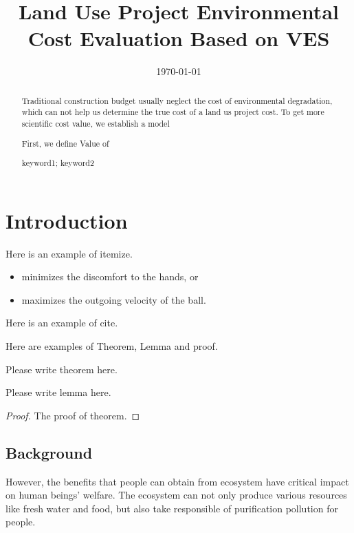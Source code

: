 \documentclass{mcmthesis}
\title{Land Use Project Environmental Cost Evaluation Based on VES}
\date{\today}
\newcommand{\upcite}[1]{\textsuperscript{\textsuperscript{\cite{#1}}}}
\begin{document}
\begin{abstract}
Traditional construction budget usually neglect the cost of environmental degradation, which can not help us determine the true cost of a land us project cost. To get more scientific cost value, we establish a model

First, we define Value of 
\begin{keywords}
keyword1; keyword2
\end{keywords}
\end{abstract}
\maketitle

\tableofcontents

\newpage

\section{Introduction}

Here is an example of itemize.
\begin{itemize}
\item minimizes the discomfort to the hands, or
\item maximizes the outgoing velocity of the ball.
\end{itemize}

Here is an\upcite{knuth1984texbook} example\upcite{lamport1994latex} of\upcite{latexopensourcehouse} cite\upcite{latexopensourcehouse1}.

Here are examples of Theorem, Lemma and proof.
\begin{Theorem} \label{Label of lemma}
Please write theorem here.
\end{Theorem}
\begin{Lemma} \label{Label of lemma}
Please write lemma here.
\end{Lemma}
\begin{proof}
The proof of theorem.
\end{proof}

\subsection{Background}
 However, the benefits that people can obtain from ecosystem have critical impact on human beings' welfare. The ecosystem can not only produce various resources like fresh water and food, but also take responsible of purification pollution for people. 
\end{document}
